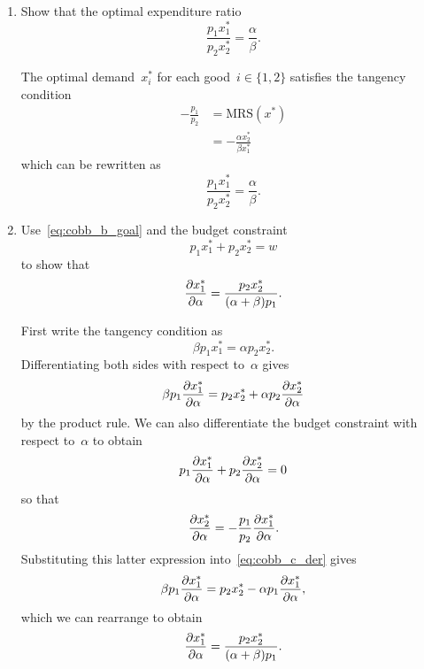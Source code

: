 \begin{enumerate}
\begin{enumerate}
		\item
		Show that the optimal expenditure ratio
		\[ \frac{p_1x_1^*}{p_2x_2^*}=\frac{\alpha}{\beta}. \label{eq:cobb_b_goal} \]
		\begin{solution}
			The optimal demand~$x_i^*$ for each good~$i\in\{1,2\}$ satisfies the tangency condition
			\begin{align}
				-\frac{p_1}{p_2}
				&= \text{MRS}(x^*)\\
				&= -\frac{\alpha x_2^*}{\beta x_1^*}
			\end{align}
			which can be rewritten as
			\[ \frac{p_1x_1^*}{p_2x_2^*}=\frac{\alpha}{\beta}. \]
		\end{solution}
		
		\item
		Use~\eqref{eq:cobb_b_goal} and the budget constraint
		\[ p_1x_1^*+p_2x_2^*=w \]
		to show that
		\[ \frac{\partial x_1^*}{\partial\alpha}=\frac{p_2x_2^*}{(\alpha+\beta)p_1}. \]
		\begin{solution}
			First write the tangency condition as
			\[ \beta p_1x_1^*=\alpha p_2x_2^*. \]
			Differentiating both sides with respect to~$\alpha$ gives
			\[ \beta p_1\pder{x_1^*}{\alpha}%
				=p_2x_2^*+\alpha p_2\pder{x_2^*}{\alpha}
				\label{eq:cobb_c_der} \]
			by the product rule.
			We can also differentiate the budget constraint with respect to~$\alpha$ to obtain
			\[ p_1\frac{\partial x_1^*}{\partial\alpha}+p_2\frac{\partial x_2^*}{\partial\alpha}=0 \]
			so that
			\[ \frac{\partial x_2^*}{\partial\alpha}=-\frac{p_1}{p_2}\frac{\partial x_1^*}{\partial\alpha}. \]
			Substituting this latter expression into~\eqref{eq:cobb_c_der} gives
			\[ \beta p_1\pder{x_1^*}{\alpha}%
				=p_2x_2^*-\alpha p_1\pder{x_1^*}{\alpha}, \]
			which we can rearrange to obtain
			\[ \frac{\partial x_1^*}{\partial\alpha}=\frac{p_2x_2^*}{(\alpha+\beta)p_1}. \]
		\end{solution}
		
	\end{enumerate}

\end{enumerate}
